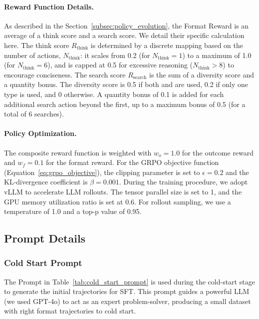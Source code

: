 \paragraph{Reward Function Details.}
As described in the Section~\ref{subsec:policy_evolution}, the Format Reward is an average of a think score and a search score. We detail their specific calculation here. The think score $R_{\text{think}}$ is determined by a discrete mapping based on the number of  actions, $N_{\text{think}}$: it scales from 0.2 (for $N_{\text{think}}=1$) to a maximum of 1.0 (for $N_{\text{think}}=6$), and is capped at 0.5 for excessive reasoning ($N_{\text{think}}>8$) to encourage conciseness. The search score $R_{\text{search}}$ is the sum of a diversity score and a quantity bonus. The diversity score is 0.5 if both  and  are used, 0.2 if only one type is used, and 0 otherwise. A quantity bonus of 0.1 is added for each additional search action beyond the first, up to a maximum bonus of 0.5 (for a total of 6 searches).


\paragraph{Policy Optimization.}
The composite reward function is weighted with $w_o = 1.0$ for the outcome reward and $w_f = 0.1$ for the format reward. For the GRPO objective function (Equation~\ref{eq:grpo_objective}), the clipping parameter is set to $\epsilon = 0.2$ and the KL-divergence coefficient is $\beta = 0.001$. During the training procedure, we adopt vLLM to accelerate LLM rollouts. The tensor
parallel size is set to 1, and the GPU memory utilization ratio is set at 0.6. For rollout sampling, we use a temperature of 1.0 and a top-p value of 0.95.





\subsection{Prompt Details}
\subsubsection{Cold Start Prompt}
The Prompt in Table~\ref{tab:cold_start_prompt} is used during the cold-start stage to generate the initial trajectories for SFT. This prompt guides a powerful LLM (we used GPT-4o) to act as an expert problem-solver, producing a small dataset with right format trajectories to cold start.




